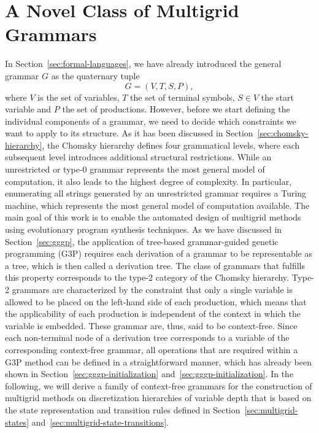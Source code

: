 \section{A Novel Class of Multigrid Grammars}
\label{sec:multigrid-grammar}
\setcounter{equation}{0}
In Section~\ref{sec:formal-languages}, we have already introduced the general grammar $G$ as the quaternary tuple 
\begin{equation*}
	G = \left(V, T, S, P \right),
\end{equation*}
where $V$ is the set of variables, $T$ the set of terminal symbols, $S \in V$ the start variable and $P$ the set of productions.
However, before we start defining the individual components of a grammar, we need to decide which constraints we want to apply to its structure.
As it has been discussed in Section~\ref{sec:chomsky-hierarchy}, the Chomsky hierarchy defines four grammatical levels, where each subsequent level introduces additional structural restrictions.
While an unrestricted or type-0 grammar represents the most general model of computation, it also leads to the highest degree of complexity.
In particular, enumerating all strings generated by an unrestricted grammar requires a Turing machine, which represents the most general model of computation available.
The main goal of this work is to enable the automated design of multigrid methods using evolutionary program synthesis techniques.
As we have discussed in Section~\ref{sec:gggp}, the application of tree-based grammar-guided genetic programming (G3P) requires each derivation of a grammar to be representable as a tree, which is then called a derivation tree.
The class of grammars that fulfills this property corresponds to the type-2 category of the Chomsky hierarchy.
Type-2 grammars are characterized by the constraint that only a single variable is allowed to be placed on the left-hand side of each production, which means that the applicability of each production is independent of the context in which the variable is embedded. 
These grammar are, thus, said to be context-free.
Since each non-terminal node of a derivation tree corresponds to a variable of the corresponding context-free grammar, all operations that are required within a G3P method can be defined in a straightforward manner, which has already been shown in Section~\ref{sec:gggp-initialization} and~\ref{sec:gggp-initialization}.
In the following, we will derive a family of context-free grammars for the construction of multigrid methods on discretization hierarchies of variable depth that is based on the state representation and transition rules defined in Section~\ref{sec:multigrid-states} and~\ref{sec:multigrid-state-transitions}.
